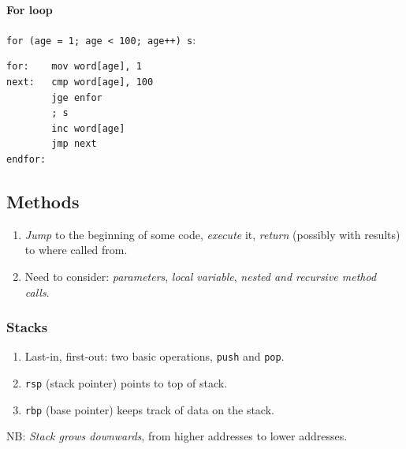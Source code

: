 \documentclass[twocolumn,english]{article}
\begin{document}
\paragraph{For loop}

\texttt{for (age = 1; age \textless{} 100; age++) s}:

\noindent 
\begin{lstlisting}[basicstyle={\footnotesize\ttfamily},frame=single]
for:    mov word[age], 1
next:   cmp word[age], 100
        jge enfor
        ; s
        inc word[age]
        jmp next
endfor: 
\end{lstlisting}



\subsection{Methods}
\begin{enumerate}
\item \emph{Jump} to the beginning of some code, \emph{execute} it, \emph{return}
(possibly with results) to where called from.
\item Need to consider: \emph{parameters}, \emph{local variable}, \emph{nested
and recursive method calls}.
\end{enumerate}

\subsubsection{Stacks}
\begin{enumerate}
\item Last-in, first-out: two basic operations, \texttt{push} and \texttt{pop}.
\item \texttt{rsp} (stack pointer) points to top of stack.
\item \texttt{rbp} (base pointer) keeps track of data on the stack.
\end{enumerate}
NB: \emph{Stack grows downwards}, from higher addresses to lower addresses.
\end{document}
